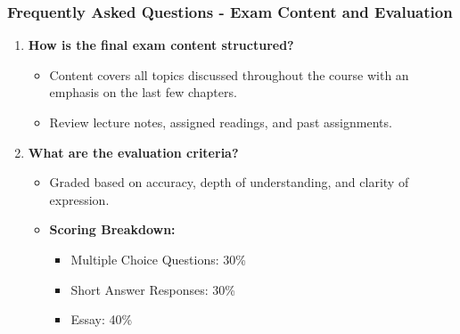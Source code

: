 \documentclass[aspectratio=169]{beamer}
\begin{document}
\begin{frame}[fragile]
    \frametitle{Frequently Asked Questions - Exam Content and Evaluation}
    \begin{enumerate}
        \item \textbf{How is the final exam content structured?}
        \begin{itemize}
            \item Content covers all topics discussed throughout the course with an emphasis on the last few chapters.
            \item Review lecture notes, assigned readings, and past assignments.
        \end{itemize}
        
        \item \textbf{What are the evaluation criteria?}
        \begin{itemize}
            \item Graded based on accuracy, depth of understanding, and clarity of expression.
            \item \textbf{Scoring Breakdown:}
            \begin{itemize}
                \item Multiple Choice Questions: 30\%
                \item Short Answer Responses: 30\%
                \item Essay: 40\%
            \end{itemize}
        \end{itemize}
    \end{enumerate}
\end{frame}
\end{document}
